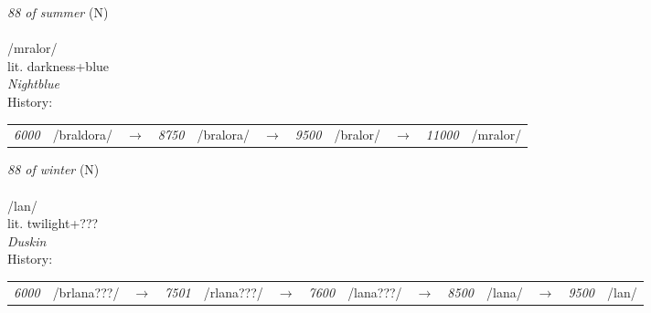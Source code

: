 \vspace{15pt}
\begin{nopagebreak}
 \textit{88 of summer} (N)\\
\\
\noindent /mr{\textprimstress}alor/\\
\noindent lit. darkness+blue\\
\noindent \textit{Nightblue}\\


\noindent History:

\vspace{-0pt}
\hspace{40pt}
\begin{tabular}{ccc}
\textit{6000} & /braldora/&$\rightarrow$ & \textit{8750} & /bralora/&$\rightarrow$ & \textit{9500} & /bralor/&$\rightarrow$ & \textit{11000} & /mralor/& \\
\end{tabular}

\vspace{20pt}\hline

\end{nopagebreak}
\filbreak



\vspace{15pt}
\begin{nopagebreak}
 \textit{88 of winter} (N)\\
\\
\noindent /l{\textprimstress}an/\\
\noindent lit. twilight+???\\
\noindent \textit{Duskin}\\


\noindent History:

\vspace{-0pt}
\hspace{40pt}
\begin{tabular}{ccc}
\textit{6000} & /brlana???/&$\rightarrow$ & \textit{7501} & /rlana???/&$\rightarrow$ & \textit{7600} & /lana???/&$\rightarrow$ & \textit{8500} & /lana/&$\rightarrow$ & \textit{9500} & /lan/& \\
\end{tabular}

\vspace{20pt}\hline

\end{nopagebreak}
\filbreak



